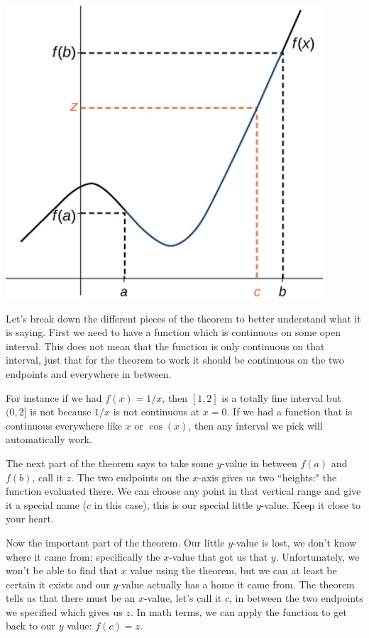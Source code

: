\begin{center}
	\includegraphics[scale=1]{images/Figure 2.3.2.png} 
\end{center}

Let's break down the different pieces of the theorem to better understand what it is saying. First we need to have a function which is continuous on some open interval. This does not mean that the function is only continuous on that interval, just that for the theorem to work it should be continuous on the two endpoints and everywhere in between.

For instance if we had $f(x) = 1/x$, then $[1,2]$ is a totally fine interval but $(0,2]$ is not because $1/x$ is not continuous at $x = 0$. If we had a function that is continuous everywhere like $x$ or $\cos(x)$, then any interval we pick will automatically work.

The next part of the theorem says to take some $y$-value in between $f(a)$ and $f(b)$, call it $z$. The two endpoints on the $x$-axis gives us two ``heights:" the function evaluated there. We can choose any point in that vertical range and give it a special name ($c$ in this case), this is our special little $y$-value. Keep it close to your heart.

Now the important part of the theorem. Our little $y$-value is lost, we don't know where it came from; specifically the $x$-value that got us that $y$. Unfortunately, we won't be able to find that $x$ value using the theorem, but we can at least be certain it exists and our $y$-value actually has a home it came from. The theorem tells us that there must be an $x$-value, let's call it $c$, in between the two endpoints we specified which gives us $z$. In math terms, we can apply the function to get back to our $y$ value: $f(c) = z$.


